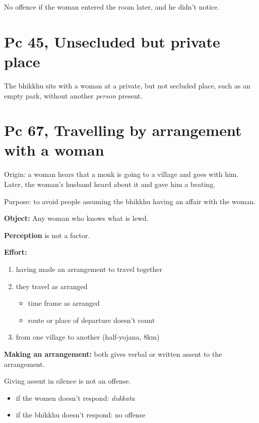 No offence if the woman entered the room later, and he didn't notice.

\section{Pc 45, Unsecluded but private place}

The bhikkhu sits with a woman at a private, but not secluded place, such
as an empty park, without another \emph{person} present.

\section{Pc 67, Travelling by arrangement with a woman}

Origin: a woman hears that a monk is going to a village and goes with
him. Later, the woman's husband heard about it and gave him a beating.

Purpose: to avoid people assuming the bhikkhu having an affair with the
woman.

\textbf{Object:} Any woman who knows what is lewd.

\textbf{Perception} is not a factor.

\textbf{Effort:}

\begin{enumerate}
\def\labelenumi{\arabic{enumi}.}
\tightlist
\item
  having made an arrangement to travel together
\item
  they travel as arranged

  \begin{itemize}
  \tightlist
  \item
    time frame as arranged
  \item
    route or place of departure doesn't count
  \end{itemize}
\item
  from one village to another (half-yojana, 8km)
\end{enumerate}

\textbf{Making an arrangement:} both gives verbal or written assent to
the arrangement.

Giving assent in silence is not an offense.

\begin{itemize}
\tightlist
\item
  if the women doesn't respond: \emph{dukkata}
\item
  if the bhikkhu doesn't respond: no offense
\end{itemize}

